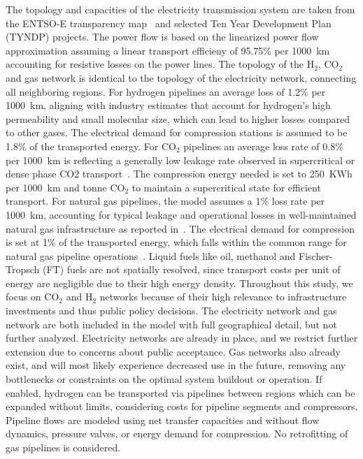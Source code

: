 \documentclass[twocolumn]{article}
\newcommand{\carbon}{CO$_2$}
\newcommand{\hydrogen}{H$_2$}
\begin{document}

The topology and capacities of the electricity transmission system are taken from the ENTSO-E transparency map~\cite{wiegmansGridkitExtractEntsoE2016} and selected Ten Year Development Plan (TYNDP) projects. The power flow is based on the linearized power flow approximation assuming a linear transport efficieny of 95.75\% per 1000~km accounting for resistive losses on the power lines. %
The topology of the \hydrogen{}, \carbon{} and gas network is identical to the topology of the electricity network, connecting all neighboring regions.
For hydrogen pipelines an average loss of 1.2\% per 1000~km, aligning with industry estimates that account for hydrogen's high permeability and small molecular size, which can lead to higher losses compared to other gases. The electrical demand for compression stations is assumed to be 1.8\% of the transported energy.
For \carbon{} pipelines an average loss rate of 0.8\% per 1000~km is reflecting a generally low leakage rate observed in supercritical or dense phase CO2 transport~\cite{liuExperimentalStudyLeakage2023,vitaliRisksSafetyCO22021}. The compression energy needed is set to 250~KWh per 1000~km and tonne \carbon{} to maintain a supercritical state for efficient transport. For natural gas pipelines, the model assumes a 1\% loss rate per 1000~km, accounting for typical leakage and operational losses in well-maintained natural gas infrastructure as reported in~\cite{NaturalGasTransmission2021}. The electrical demand for compression is set at 1\% of the transported energy, which falls within the common range for natural gas pipeline operations~\cite{mcvayreneeMethaneEmissionsGas2023}.
%
Liquid fuels like oil, methanol and Fischer-Tropsch (FT) fuels are not spatially resolved, since transport costs per unit of energy are negligible due to their high energy density. Throughout this study, we focus on \carbon{} and \hydrogen{} networks because of their high relevance to infrastructure investments and thus public policy decisions. The electricity network and gas network are both included in the model with full geographical detail, but not further analyzed. Electricity networks are already in place, and we restrict further extension due to concerns about public acceptance. Gas networks also already exist, and will most likely experience decreased use in the future, removing any bottlenecks or constraints on the optimal system buildout or operation.
If enabled, hydrogen can be transported via pipelines between regions which can be expanded without limits, considering costs for pipeline segments and compressors. Pipeline flows are modeled using net transfer capacities and without flow dynamics, pressure valves, or energy demand for compression. No retrofitting of gas pipelines is considered.
\end{document}
